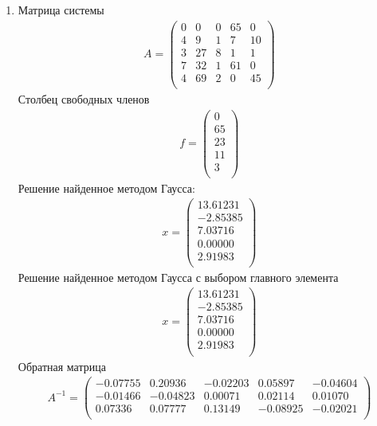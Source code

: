 \documentclass[a4paper,12pt,titlepage,finall]{article}
\begin{document}
\begin{enumerate}
\item
Матрица системы
\begin{align*}
A = \begin{pmatrix}
0&     0&     0&    65&     0 \\
   4&     9&     1&     7&    10 \\
   3&    27&     8&     1&     1 \\
   7&    32&     1&    61&     0 \\
   4&    69&     2&     0&    45 \\
\end{pmatrix}
\end{align*}
Столбец свободных членов
\begin{align*}
f = \begin{pmatrix}
   0 \\
  65 \\
  23 \\
  11 \\
   3 \\
\end{pmatrix}
\end{align*}
Решение найденное методом Гаусса:
\begin{align*}
x = \begin{pmatrix}
13.61231 \\
  -2.85385 \\
   7.03716 \\
   0.00000 \\
   2.91983 \\
\end{pmatrix}
\end{align*}
Решение найденное методом Гаусса с выбором главного элемента
\begin{align*}
x = \begin{pmatrix}
  13.61231 \\
  -2.85385 \\
   7.03716 \\
   0.00000 \\
   2.91983 \\
\end{pmatrix}
\end{align*}
Обратная матрица
\begin{align*}
A^{-1} = \begin{pmatrix}
  -0.07755&     0.20936&    -0.02203&     0.05897&    -0.04604 \\
  -0.01466&    -0.04823&     0.00071&     0.02114&     0.01070 \\
   0.07336&     0.07777&     0.13149&    -0.08925&    -0.02021 \\

\end{pmatrix}
\end{align*}
\end{enumerate}
\end{document}
